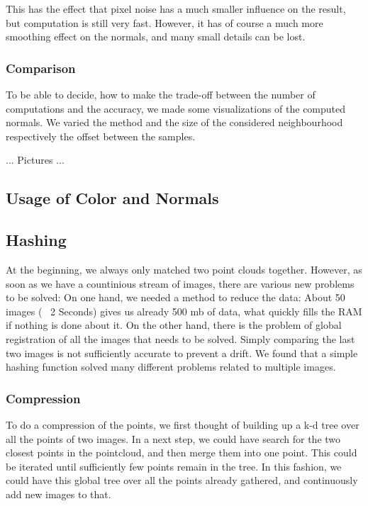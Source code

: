 \documentclass[10pt,twocolumn,letterpaper]{article}
\begin{document}
This has the effect that pixel noise has a much smaller influence on the result, but computation is still very fast. However, it has of course a much more
smoothing effect on the normals, and many small details can be lost.

\subsubsection{Comparison}
To be able to decide, how to make the trade-off between the number of computations and the accuracy, we made some visualizations of the computed normals.
We varied the method and the size of the considered neighbourhood respectively the offset between the samples.

... Pictures ...



\subsection{Usage of Color and Normals}

\subsection{Hashing}
At the beginning, we always only matched two point clouds together. However, as soon as we have a countinious stream of images,
there are various new problems to be solved: On one hand, we needed a method to reduce the data: About 50 images (~ 2 Seconds)
gives us already 500 mb of data, what quickly fills the RAM if nothing is done about it. On the other hand, there is the problem
of global registration of all the images that needs to be solved. Simply comparing the last two images is not sufficiently accurate
to prevent a drift. We found that a simple hashing function solved many different problems related to multiple images.

\subsubsection{Compression}
To do a compression of the points, we first thought of building up a k-d tree over all the points of two images. In a next step, we could have
search for the two closest points in the pointcloud, and then merge them into one point. This could be iterated until sufficiently few
points remain in the tree. In this fashion, we could have this global tree over all the points already gathered, and continuously add new
images to that.
\end{document}
